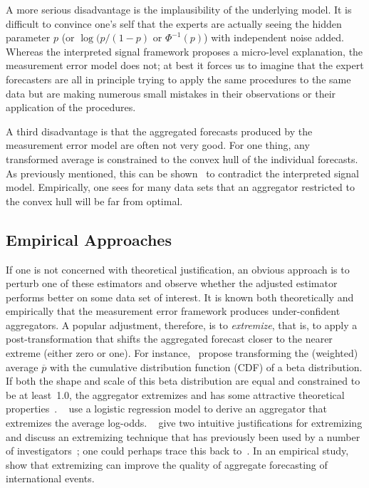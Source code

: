 \documentclass[11pt]{article}
\theoremstyle{definition}
\theoremstyle{definition}
\def\pb{\overline{p}}
\begin{document}
A more serious disadvantage is the implausibility of the underlying 
model.  It is difficult to convince one's self that the experts
are actually seeing the hidden parameter $p$ (or $\log(p/(1-p)$ 
or $\Phi^{-1} (p)$) with independent noise added.  Whereas the
interpreted signal framework proposes a micro-level explanation,
the measurement error model does not; at best it forces us to 
imagine that the expert forecasters are all in principle trying
to apply the same procedures to the same data but are making
numerous small mistakes in their observations or their application 
of the procedures.  

A third disadvantage is that the aggregated forecasts produced by
the measurement error model are often not very good.  For one thing,
any transformed average is constrained to the convex hull of the
individual forecasts.  As previously mentioned, this can be
shown~\citep{parunak2013characterizing} to contradict the 
interpreted signal model.  Empirically, one sees for many data 
sets that an aggregator restricted to the convex hull will be far 
from optimal.  

\subsection{Empirical Approaches}
\label{ss:empirical}

If one is not concerned with theoretical justification, an obvious
approach is to perturb one of these estimators and observe 
whether the adjusted estimator performs better on some data set
of interest.  It is known both theoretically and empirically
that the measurement error framework produces under-confident 
aggregators.  A popular adjustment, therefore, is to {\em extremize},
that is, to apply a post-transformation that shifts the 
aggregated forecast closer to the nearer extreme (either zero or one).
For instance,~\citet{Ranjan08} propose transforming
the (weighted) average $\pb$ with the cumulative distribution function
(CDF) of a beta distribution.  If both the shape and scale of this 
beta distribution are equal and constrained to be at least~1.0,
the aggregator extremizes and has some attractive theoretical
properties~\citep{Wallsten2001}.  ~\citet{satopaa}
use a logistic regression model to derive an aggregator that extremizes
the average log-odds.  ~\citet{baron2014two} give two intuitive
justifications for extremizing and discuss an extremizing technique
that has previously been used by a number of investigators~\citep{Erev1994,
shlomi2010subjective}; one could perhaps trace this back
to~\citet{karmarkar1978subjectively}.  
In an empirical study,~\citet{mellers2014psychological} show that 
extremizing can improve the quality of aggregate forecasting of 
international events.  
\end{document}

